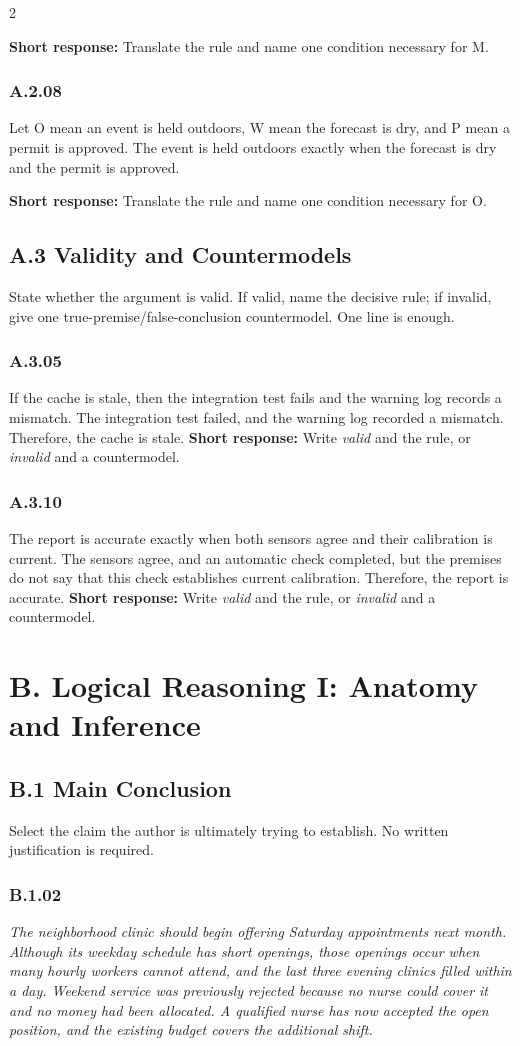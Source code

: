\documentclass[10pt]{extarticle}
\newcommand{\bankitem}[1]{\subsubsection*{#1}}
\begin{document}
\begin{multicols}{2}
\begin{samepage}
\textbf{Short response:} Translate the rule and name one condition necessary for M.
\end{samepage}\par\smallskip
\begin{samepage}
\bankitem{A.2.08}
Let O mean an event is held outdoors, W mean the forecast is dry, and P mean a permit is approved. The event is held outdoors exactly when the forecast is dry and the permit is approved.

\textbf{Short response:} Translate the rule and name one condition necessary for O.
\end{samepage}\par\smallskip
\subsection*{A.3 Validity and Countermodels}
State whether the argument is valid. If valid, name the decisive rule; if invalid,
give one true-premise/false-conclusion countermodel. One line is enough.
\begin{samepage}
\bankitem{A.3.05}
If the cache is stale, then the integration test fails and the warning log records a mismatch. The integration test failed, and the warning log recorded a mismatch. Therefore, the cache is stale.
\textbf{Short response:} Write \emph{valid} and the rule, or \emph{invalid} and a countermodel.
\end{samepage}\par\smallskip
\begin{samepage}
\bankitem{A.3.10}
The report is accurate exactly when both sensors agree and their calibration is current. The sensors agree, and an automatic check completed, but the premises do not say that this check establishes current calibration. Therefore, the report is accurate.
\textbf{Short response:} Write \emph{valid} and the rule, or \emph{invalid} and a countermodel.
\end{samepage}\par\smallskip
\section*{B. Logical Reasoning I: Anatomy and Inference}
\subsection*{B.1 Main Conclusion}
Select the claim the author is ultimately trying to establish. No written justification is required.
\begin{samepage}
\bankitem{B.1.02}
\emph{The neighborhood clinic should begin offering Saturday appointments next month. Although its weekday schedule has short openings, those openings occur when many hourly workers cannot attend, and the last three evening clinics filled within a day. Weekend service was previously rejected because no nurse could cover it and no money had been allocated. A qualified nurse has now accepted the open position, and the existing budget covers the additional shift.}


\end{samepage}
\end{multicols}
\end{document}
